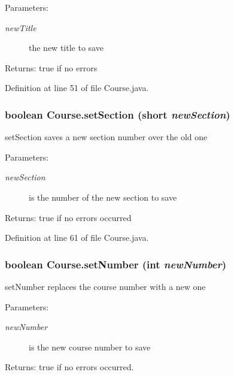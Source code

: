 \begin{Desc}
\item[Parameters:]
\begin{description}
\item[{\em newTitle}]the new title to save \end{description}
\end{Desc}
\begin{Desc}
\item[Returns:]true if no errors \end{Desc}


Definition at line 51 of file Course.java.\hypertarget{classCourse_93bd3af1063181e32bcc4cddb3e2348b}{
\subsubsection{\setlength{\rightskip}{0pt plus 5cm}boolean Course.setSection (short {\em newSection})}}
\label{classCourse_93bd3af1063181e32bcc4cddb3e2348b}


setSection saves a new section number over the old one 

\begin{Desc}
\item[Parameters:]
\begin{description}
\item[{\em newSection}]is the number of the new section to save \end{description}
\end{Desc}
\begin{Desc}
\item[Returns:]true if no errors occurred \end{Desc}


Definition at line 61 of file Course.java.\hypertarget{classCourse_43edb09a6091becee394eb5a5cd7a17a}{
\subsubsection{\setlength{\rightskip}{0pt plus 5cm}boolean Course.setNumber (int {\em newNumber})}}
\label{classCourse_43edb09a6091becee394eb5a5cd7a17a}


setNumber replaces the course number with a new one 

\begin{Desc}
\item[Parameters:]
\begin{description}
\item[{\em newNumber}]is the new course number to save \end{description}
\end{Desc}
\begin{Desc}
\item[Returns:]true if no errors occurred. \end{Desc}


